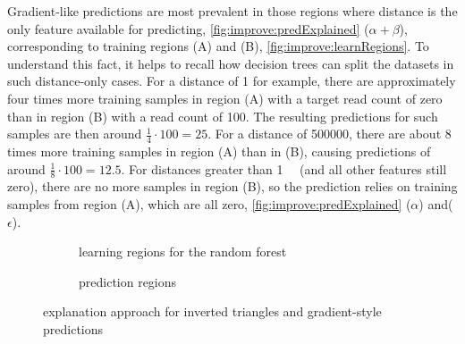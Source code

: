 Gradient-like predictions are most prevalent in those regions where distance is the only feature available for predicting,
\autoref{fig:improve:predExplained} ($\alpha + \beta$), corresponding to training regions (A) and (B), 
\autoref{fig:improve:learnRegions}.
To understand this fact, it helps to recall how decision trees can split the datasets in such distance-only cases.
For a distance of \SI{1}{\bp} for example, there are approximately four times more training samples
in region (A) with a target read count of zero than in region (B) with a read count of 100. 
The resulting predictions for such samples are then around $\frac{1}{4}\cdot100=25$. 
For a distance of \SI{500000}{\bp}, there are about 8 times more training samples in region (A) than in (B), 
causing predictions of around $\frac{1}{8}\cdot100=12.5$.
For distances greater than \SI{1}{\mega\bp} (and all other features still zero), there are no more samples in region (B), 
so the prediction relies on training samples from region (A), 
which are all zero, \autoref{fig:improve:predExplained} ($\alpha$) and\;($\epsilon$).
\begin{figure}[ht]
\begin{subfigure}{\textwidth}
 \centering
 \caption{learning regions for the random forest}
 \label{fig:improve:learnRegions}
\end{subfigure}\vspace{3mm}
\begin{subfigure}{\textwidth}
 \centering
 \caption{prediction regions}
 \label{fig:improve:predExplained}
\end{subfigure}
\caption{explanation approach for inverted triangles and gradient-style predictions}
\end{figure}

